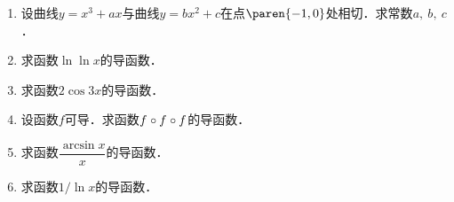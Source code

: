 \documentclass[a4paper,punct=CCT]{ctexbook}
\theoremstyle{definition}
\theoremstyle{remark}
\newif\ifshowsol
\begin{document}
\begin{enumerate}
\item 设曲线\(y = x^3 + ax\)与曲线\(y = bx^2 + c\)在点\(\paren{-1,0}\)处相切．求常数\(a,\ b,\ c\)．

  \ifshowsol
  解方程组
  \begin{equation*}
    \left\{
      \begin{aligned}
        -1 - a &= 0 \\
        b + c &= 0 \\
        3 + a &= -2b
      \end{aligned}
    \right.
  \end{equation*}
  得到\(a = b = -1,\ c = 1\)．
  \fi

\item 求函数\(\ln\ln x\)的导函数．
  \ifshowsol
  \begin{equation*}
    (\ln\ln x)'
    = \frac{\ln' x}{\ln x}
    = \frac{1}{x \ln x}.
  \end{equation*}
  \fi

\item 求函数\(2\cos3x\)的导函数．
  \ifshowsol
  \begin{equation*}
    (2\cos3x)' = 2(\cos3x)' = 2(-\sin3x)(3x)' = -6\sin3x.
  \end{equation*}
  \fi

\item 设函数\(f\)可导．求函数\(f\mkern1mu \circ f\mkern1mu \circ f\)的导函数．
  \ifshowsol
  \begin{equation*}
    (\,f\mkern1mu \circ f\mkern1mu \circ f)'
    = (\,f'\mkern-4mu \circ f\mkern1mu \circ f) (\,f\mkern1mu \circ f)'
    = (\,f'\mkern-4mu \circ f\mkern1mu \circ f) (\,f'\mkern-4mu \circ f) \,f'.
  \end{equation*}
  \fi

\item 求函数\(\dfrac{\arcsin x}{x}\)的导函数．
  \ifshowsol
  \begin{equation*}
    \paren[\bigg]{\frac{\arcsin x}{x}}'
    = \frac{x\big/\!\sqrt{1-\smash{x^2}} - \arcsin x}{x^2}
    = \frac{1}{x \sqrt{1-\smash{x^2}}} - \frac{\arcsin x}{x^2}
  \end{equation*}
  \fi

\item 求函数\(1/\!\ln x\)的导函数．
  \ifshowsol
  \begin{equation*}
    \paren[\bigg]{\frac1{\ln x}}'
    = - \frac{\ln'x}{\operatorname{ln^2} x}
    = - \frac{1}{x \operatorname{ln^2} x}.
  \end{equation*}
  \fi


\end{enumerate}
\end{document}
